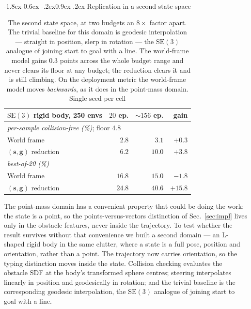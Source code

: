 \documentclass[10pt,twocolumn,letterpaper]{article}
\makeatletter
\newcommand{\toprule}{\hline}
\newcommand{\midrule}{\hline}
\newcommand{\bottomrule}{\hline}
\renewcommand\subsection{\@startsection{subsection}{2}{\z@}%
  {-1.8ex\@plus -0.6ex \@minus -.2ex}{0.9ex \@plus .2ex}%
  {\normalfont\normalsize\bfseries}}
\theoremstyle{plain}
\newcommand{\svec}{\mathbf{s}}
\newcommand{\gvec}{\mathbf{g}}
\newcommand{\SE}{\mathrm{SE}(3)}
\makeatother
\begin{document}
\subsection{Replication in a second state space}
\label{sec:se3}

\begin{table}[t]
\centering
\footnotesize
\setlength{\tabcolsep}{4pt}
\begin{tabular}{lrrr}
\toprule
$\SE$ rigid body, 250 envs & $20$ ep. & ${\sim}156$ ep. & gain \\
\midrule
\multicolumn{4}{l}{\emph{per-sample collision-free (\%)}; floor $4.8$}\\
World frame               & $2.8$  & $3.1$  & $+0.3$ \\
$(\svec,\gvec)$ reduction & $6.2$  & $\mathbf{10.0}$ & $+3.8$ \\[2pt]
\multicolumn{4}{l}{\emph{best-of-20 (\%)}}\\
World frame               & $16.8$ & $15.0$ & $-1.8$ \\
$(\svec,\gvec)$ reduction & $24.8$ & $\mathbf{40.6}$ & $+15.8$ \\
\bottomrule
\end{tabular}
\caption{The second state space, at two budgets an $8\times$ factor apart. The
trivial baseline for this domain is geodesic interpolation --- straight in
position, slerp in rotation --- the $\SE$ analogue of joining start to goal with
a line. The world-frame model gains $0.3$ points across the whole budget range and
never clears its floor at any budget; the reduction clears it and is still
climbing. On the deployment metric the world-frame model moves \emph{backwards},
as it does in the point-mass domain. Single seed per cell}
\label{tab:se3}
\end{table}

The point-mass domain has a convenient property that could be doing the work: the
state is a point, so the points-versus-vectors distinction of Sec.~\ref{sec:impl}
lives only in the obstacle features, never inside the trajectory. To test whether
the result survives without that convenience we built a second domain --- an
L-shaped rigid body in the same clutter, where a state is a full pose, position
and orientation, rather than a point. The trajectory now carries orientation, so
the typing distinction moves inside the state. Collision checking evaluates the
obstacle SDF at the body's transformed sphere centres; steering interpolates
linearly in position and geodesically in rotation; and the trivial baseline is
the corresponding geodesic interpolation, the $\SE$ analogue of joining start to
goal with a line.
\end{document}
